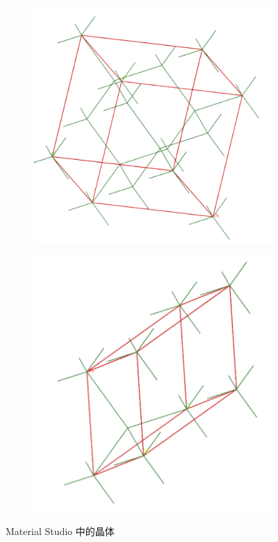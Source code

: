 \begin{figure}
    \centering
    \begin{subfigure}[c]{0.4\linewidth}
        \includegraphics[width=\linewidth]{screenshots/unit-cell.png}
    \end{subfigure}
    \begin{subfigure}[c]{0.4\linewidth}
        \includegraphics[width=\linewidth]{screenshots/primitve-cell.png}
    \end{subfigure}
    \caption{Material Studio 中的晶体}\label{fig:ms-cells}
\end{figure}

